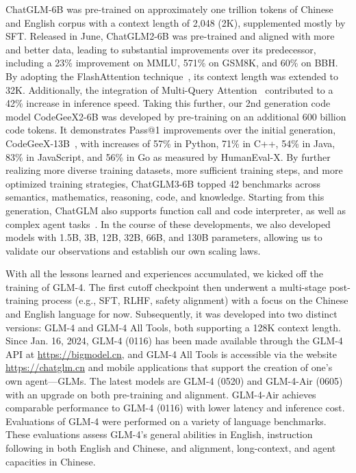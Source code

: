 ChatGLM-6B was pre-trained on approximately one trillion tokens of Chinese and English corpus with a context length of 2,048 (2K), supplemented mostly by SFT.
Released in June, ChatGLM2-6B was pre-trained and aligned with more and better data, leading to substantial improvements over its predecessor, including a 23\% improvement on MMLU, 571\% on GSM8K, and 60\% on BBH. 
By adopting the FlashAttention technique~\cite{dao2022flashattention}, its context length was extended to 32K. 
Additionally, the integration of Multi-Query Attention~\cite{shazeer2019fast} contributed to a 42\% increase in inference speed. 
Taking this further, our 2nd generation code model CodeGeeX2-6B was developed by pre-training on an additional 600 billion code tokens. 
It demonstrates Pass@1 improvements over the initial generation, CodeGeeX-13B~\cite{zheng2023codegeex}, with increases of 57\% in Python, 71\% in C++, 54\% in Java, 83\% in JavaScript, and 56\% in Go  as measured by HumanEval-X. 
By further realizing more diverse training datasets, more sufficient training steps, and more optimized training strategies, ChatGLM3-6B topped 42 benchmarks across semantics, mathematics, reasoning, code, and knowledge. 
Starting from this generation, ChatGLM also supports function call and code interpreter, as well as complex agent tasks~\cite{deng2023mind2web,shridhar2020alfworld,yao2022webshop}. 
In the course of these developments, we also developed models with 1.5B, 3B, 12B, 32B, 66B, and 130B parameters, allowing us to validate our observations and establish our own scaling laws. 



With all the lessons learned and experiences accumulated, we kicked off the training of GLM-4. 
The first cutoff checkpoint then underwent a multi-stage post-training process (e.g., SFT, RLHF, safety alignment) with a focus on the Chinese and English language for now. 
Subsequently, it was developed into two distinct versions: GLM-4 and GLM-4 All Tools, both supporting a 128K context length. 
Since Jan. 16, 2024, GLM-4 (0116) has been made available through the GLM-4 API at \url{https://bigmodel.cn}, and GLM-4 All Tools is accessible via the website \url{https://chatglm.cn} and mobile applications that support the creation of one's own agent---GLMs. 
The latest models are GLM-4 (0520) and GLM-4-Air (0605) with an upgrade on both pre-training and alignment. 
GLM-4-Air achieves comparable performance to GLM-4 (0116) with lower latency and inference cost. 
Evaluations of GLM-4 were performed on a variety of language benchmarks. 
These evaluations assess GLM-4's general abilities in English, instruction following in both English and Chinese, and alignment, long-context, and agent capacities in Chinese.  

